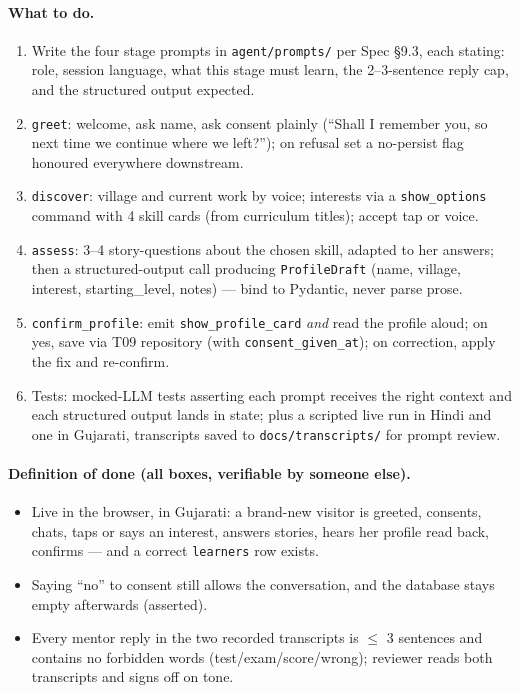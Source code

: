 \documentclass[11pt]{article}
\newcommand{\code}[1]{\texttt{#1}}
\newcommand{\dod}{\paragraph{Definition of done (all boxes, verifiable by someone else).}}
\begin{document}
\paragraph{What to do.}
\begin{enumerate}
  \item Write the four stage prompts in \code{agent/prompts/} per Spec \S9.3, each stating: role, session language, what this stage must learn, the 2--3-sentence reply cap, and the structured output expected.
  \item \code{greet}: welcome, ask name, ask consent plainly (``Shall I remember you, so next time we continue where we left?''); on refusal set a no-persist flag honoured everywhere downstream.
  \item \code{discover}: village and current work by voice; interests via a \code{show\_options} command with 4 skill cards (from curriculum titles); accept tap or voice.
  \item \code{assess}: 3--4 story-questions about the chosen skill, adapted to her answers; then a structured-output call producing \code{ProfileDraft} (name, village, interest, starting\_level, notes) --- bind to Pydantic, never parse prose.
  \item \code{confirm\_profile}: emit \code{show\_profile\_card} \emph{and} read the profile aloud; on yes, save via T09 repository (with \code{consent\_given\_at}); on correction, apply the fix and re-confirm.
  \item Tests: mocked-LLM tests asserting each prompt receives the right context and each structured output lands in state; plus a scripted live run in Hindi and one in Gujarati, transcripts saved to \code{docs/transcripts/} for prompt review.
\end{enumerate}
\dod
\begin{itemize}
  \item Live in the browser, in Gujarati: a brand-new visitor is greeted, consents, chats, taps or says an interest, answers stories, hears her profile read back, confirms --- and a correct \code{learners} row exists.
  \item Saying ``no'' to consent still allows the conversation, and the database stays empty afterwards (asserted).
  \item Every mentor reply in the two recorded transcripts is $\leq$ 3 sentences and contains no forbidden words (test/exam/score/wrong); reviewer reads both transcripts and signs off on tone.
\end{itemize}
\end{document}
